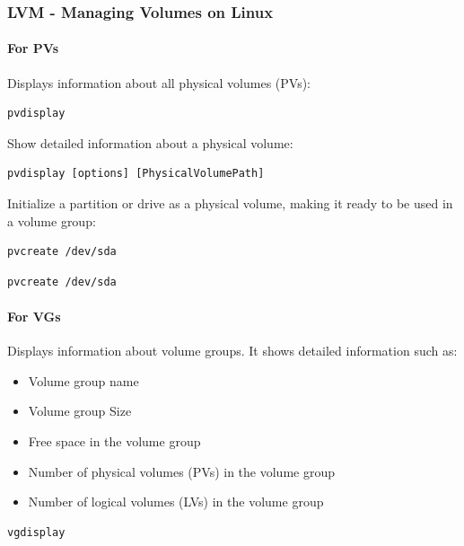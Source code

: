 \documentclass{article}
\newenvironment{codetemplate}[1][]{%
  \mybasecolorbox[#1]
  \itshape
}{%
  \endmybasecolorbox
}
\begin{document}
\subsubsection{LVM - Managing Volumes on Linux}

\paragraph{For PVs}

Displays information about all physical volumes (PVs):
\begin{codetemplate}
\begin{verbatim}
pvdisplay
\end{verbatim}
\end{codetemplate}

Show detailed information about a physical volume:
\begin{codetemplate}
\begin{verbatim}
pvdisplay [options] [PhysicalVolumePath]
\end{verbatim}
\end{codetemplate}

Initialize a partition or drive as a physical volume, making it ready to be used in a volume group:
\begin{codetemplate}
\begin{verbatim}
pvcreate /dev/sda
\end{verbatim}
\end{codetemplate}
\begin{codetemplate}
\begin{verbatim}
pvcreate /dev/sda
\end{verbatim}
\end{codetemplate}

\paragraph{For VGs}

Displays information about volume groups. It shows detailed information such as:
\begin{itemize}
    \item Volume group name
    \item Volume group Size
    \item Free space in the volume group
    \item Number of physical volumes (PVs) in the volume group
    \item Number of logical volumes (LVs) in the volume group
\end{itemize}
\begin{codetemplate}
\begin{verbatim}
vgdisplay
\end{verbatim}
\end{codetemplate}
\end{document}
